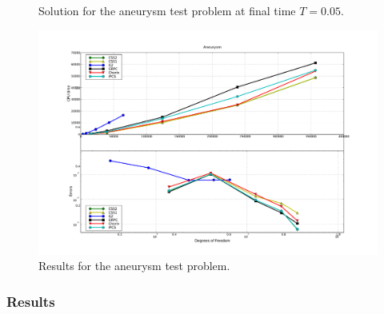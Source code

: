 \begin{figure}[htbp]
  \begin{center}
    \caption{Solution for the aneurysm test problem at final time $T = 0.05$.}
    \label{fig:aneurysm}
  \end{center}
\end{figure}

\begin{figure}
  \begin{center}
    \includegraphics[width=14cm]{chapters/kvs-1/pdf/new_aneurysm_res.pdf}
    \caption{Results for the aneurysm test problem.}
    \label{fig:aneurysm_res}
  \end{center}
\end{figure}

\subsubsection{Results}


